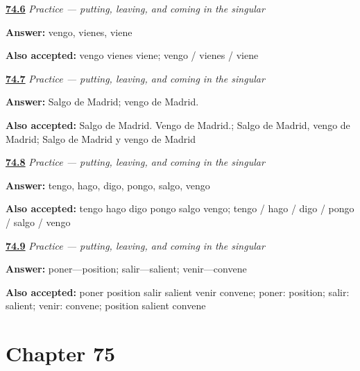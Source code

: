 \noindent\begin{minipage}[t]{\linewidth}
\raggedright
\hyperlink{review-ES-C13-practice-venir-forms}{\textbf{74.6}} \emph{Practice — putting, leaving, and coming in the singular}\par
\small \textbf{Answer:} vengo, vienes, viene\par
\footnotesize \textbf{Also accepted:} vengo vienes viene; vengo / vienes / viene
\end{minipage}\par\medskip

\noindent\begin{minipage}[t]{\linewidth}
\raggedright
\hyperlink{review-ES-C13-practice-leave-come}{\textbf{74.7}} \emph{Practice — putting, leaving, and coming in the singular}\par
\small \textbf{Answer:} Salgo de Madrid; vengo de Madrid.\par
\footnotesize \textbf{Also accepted:} Salgo de Madrid. Vengo de Madrid.; Salgo de Madrid, vengo de Madrid; Salgo de Madrid y vengo de Madrid
\end{minipage}\par\medskip

\noindent\begin{minipage}[t]{\linewidth}
\raggedright
\hyperlink{review-ES-C13-practice-six-yo-forms}{\textbf{74.8}} \emph{Practice — putting, leaving, and coming in the singular}\par
\small \textbf{Answer:} tengo, hago, digo, pongo, salgo, vengo\par
\footnotesize \textbf{Also accepted:} tengo hago digo pongo salgo vengo; tengo / hago / digo / pongo / salgo / vengo
\end{minipage}\par\medskip

\noindent\begin{minipage}[t]{\linewidth}
\raggedright
\hyperlink{review-ES-C13-practice-root-families}{\textbf{74.9}} \emph{Practice — putting, leaving, and coming in the singular}\par
\small \textbf{Answer:} poner—position; salir—salient; venir—convene\par
\footnotesize \textbf{Also accepted:} poner position salir salient venir convene; poner: position; salir: salient; venir: convene; position salient convene
\end{minipage}\par\medskip

\section*{Chapter 75}

